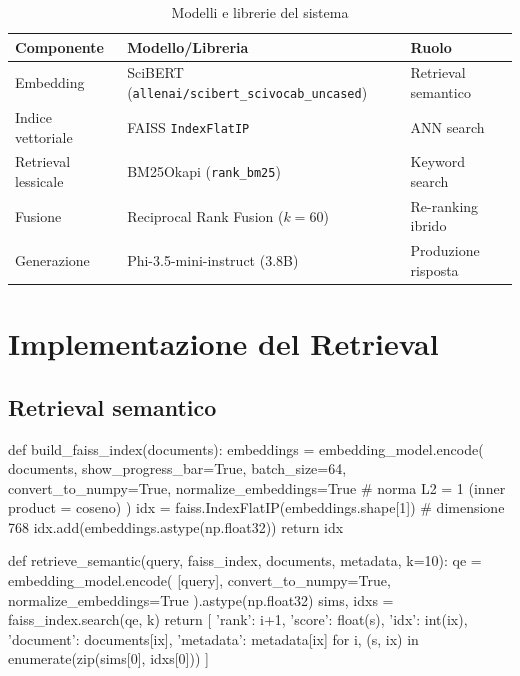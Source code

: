 \documentclass[12pt,a4paper]{article}
\begin{document}
\begin{table}[H]
  \centering
  \caption{Modelli e librerie del sistema}
  \begin{tabular}{lll}
    \toprule
    \textbf{Componente}    & \textbf{Modello/Libreria}                      & \textbf{Ruolo} \\
    \midrule
    Embedding              & SciBERT (\texttt{allenai/scibert\_scivocab\_uncased}) & Retrieval semantico \\
    Indice vettoriale      & FAISS \texttt{IndexFlatIP}                     & ANN search \\
    Retrieval lessicale    & BM25Okapi (\texttt{rank\_bm25})                & Keyword search \\
    Fusione                & Reciprocal Rank Fusion ($k=60$)                & Re-ranking ibrido \\
    Generazione            & Phi-3.5-mini-instruct (3.8B)                   & Produzione risposta \\
    \bottomrule
  \end{tabular}
\end{table}

\section{Implementazione del Retrieval}

\subsection{Retrieval semantico}

\begin{pylisting}[title={Costruzione indice FAISS e retrieval semantico}]
def build_faiss_index(documents):
    embeddings = embedding_model.encode(
        documents, show_progress_bar=True,
        batch_size=64, convert_to_numpy=True,
        normalize_embeddings=True          # norma L2 = 1 (inner product = coseno)
    )
    idx = faiss.IndexFlatIP(embeddings.shape[1])  # dimensione 768
    idx.add(embeddings.astype(np.float32))
    return idx

def retrieve_semantic(query, faiss_index, documents, metadata, k=10):
    qe = embedding_model.encode(
        [query], convert_to_numpy=True, normalize_embeddings=True
    ).astype(np.float32)
    sims, idxs = faiss_index.search(qe, k)
    return [
        {'rank': i+1, 'score': float(s), 'idx': int(ix),
         'document': documents[ix], 'metadata': metadata[ix]}
        for i, (s, ix) in enumerate(zip(sims[0], idxs[0]))
    ]
\end{pylisting}
\end{document}
